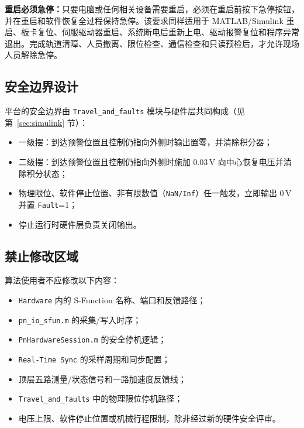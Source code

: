 \documentclass[12pt,a4paper]{article}
\begin{document}
\begin{dangerbox}
    \textbf{重启必须急停：}只要电脑或任何相关设备需要重启，必须在重启前按下急停按钮，并在重启和软件恢复全过程保持急停。该要求同样适用于 MATLAB/Simulink 重启、板卡复位、伺服驱动器重启、系统断电后重新上电、驱动报警复位和程序异常退出。完成轨道清障、人员撤离、限位检查、通信检查和只读预检后，才允许现场人员解除急停。
\end{dangerbox}

\subsection{安全边界设计}

平台的安全边界由 \texttt{Travel\_and\_faults} 模块与硬件层共同构成（见第~\ref{sec:simulink} 节）：

\begin{itemize}
    \item 一级摆：到达预警位置且控制仍指向外侧时输出置零，并清除积分器；
    \item 二级摆：到达预警位置且控制仍指向外侧时施加 0.03\,V 向中心恢复电压并清除积分状态；
    \item 物理限位、软件停止位置、非有限数值（\texttt{NaN/Inf}）任一触发，立即输出 0\,V 并置 \texttt{Fault}=1；
    \item 停止运行时硬件层负责关闭输出。
\end{itemize}

\subsection{禁止修改区域}

\begin{dangerbox}
    算法使用者不应修改以下内容：
    \begin{itemize}[nosep]
        \item \texttt{Hardware} 内的 S-Function 名称、端口和反馈路径；
        \item \texttt{pn\_io\_sfun.m} 的采集/写入时序；
        \item \texttt{PnHardwareSession.m} 的安全停机逻辑；
        \item \texttt{Real-Time Sync} 的采样周期和同步配置；
        \item 顶层五路测量/状态信号和一路加速度反馈线；
        \item \texttt{Travel\_and\_faults} 中的物理限位停机路径；
        \item 电压上限、软件停止位置或机械行程限制，除非经过新的硬件安全评审。
    \end{itemize}
\end{dangerbox}
\end{document}
